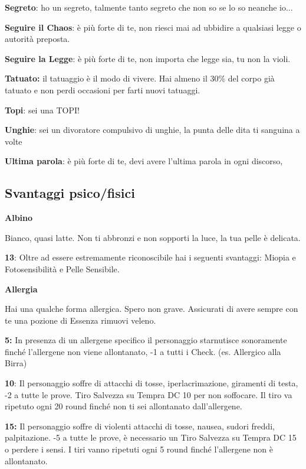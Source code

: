 \documentclass[a4paper,11pt,twoside,openany]{book}
\begin{document}
\textbf{Segreto}: ho un segreto, talmente tanto segreto che non so se lo so neanche io...

\textbf{Seguire il Chaos}: è più forte di te, non riesci mai ad ubbidire a qualsiasi legge o autorità preposta.

\textbf{Seguire la Legge}: è più forte di te, non importa che legge sia, tu non la violi.

\textbf{Tatuato:} il tatuaggio è il modo di vivere. Hai almeno il 30\% del corpo già tatuato e non perdi occasioni per farti nuovi tatuaggi.

\textbf{Topi}: sei una TOPI!

\textbf{Unghie}: sei un divoratore compulsivo di unghie, la punta delle dita ti sanguina a volte

\textbf{Ultima parola}: è più forte di te, devi avere l'ultima parola in ogni discorso,

\pagebreak

\subsection{Svantaggi psico/fisici}

\label{svantaggi-psicofisici}

\textbf{Albino}

Bianco, quasi latte. Non ti abbronzi e non sopporti la luce, la tua pelle è delicata.

\textbf{13}: Oltre ad essere estremamente riconoscibile hai i seguenti svantaggi: Miopia e Fotosensibilità e Pelle Sensibile.

\textbf{Allergia}

Hai una qualche forma allergica. Spero non grave. Assicurati di avere sempre con te una pozione di Essenza rimuovi veleno.

\textbf{5:} In presenza di un allergene specifico il personaggio starnutisce sonoramente finché l'allergene non viene allontanato, -1 a tutti i Check. (es. Allergico alla Birra)

\textbf{10}: Il personaggio soffre di attacchi di tosse, iperlacrimazione, giramenti di testa, -2 a tutte le prove. Tiro Salvezza su Tempra DC 10 per non soffocare. Il tiro va ripetuto ogni 20 round finché non ti sei allontanato dall'allergene.

\textbf{15:} Il personaggio soffre di violenti attacchi di tosse, nausea, sudori freddi, palpitazione. -5 a tutte le prove, è necessario un Tiro Salvezza su Tempra DC 15 o perdere i sensi. I tiri vanno ripetuti ogni 5 round finché l'allergene non è allontanato.
\end{document}
